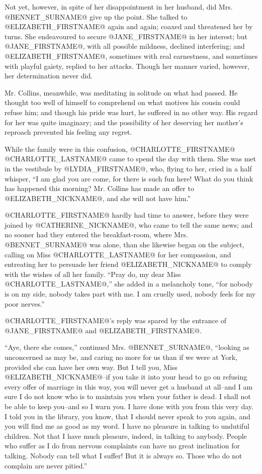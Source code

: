 Not yet, however, in spite of her disappointment in her husband, did
Mrs. @BENNET_SURNAME@ give up the point. She talked to @ELIZABETH_FIRSTNAME@ again and again;
coaxed and threatened her by turns. She endeavoured to secure @JANE_FIRSTNAME@
in her interest; but @JANE_FIRSTNAME@, with all possible mildness, declined
interfering; and @ELIZABETH_FIRSTNAME@, sometimes with real earnestness, and
sometimes with playful gaiety, replied to her attacks. Though her manner
varied, however, her determination never did.

Mr. Collins, meanwhile, was meditating in solitude on what had passed.
He thought too well of himself to comprehend on what motives his cousin
could refuse him; and though his pride was hurt, he suffered in no other
way. His regard for her was quite imaginary; and the possibility of her
deserving her mother's reproach prevented his feeling any regret.

While the family were in this confusion, @CHARLOTTE_FIRSTNAME@ @CHARLOTTE_LASTNAME@ came to spend
the day with them. She was met in the vestibule by @LYDIA_FIRSTNAME@, who, flying to
her, cried in a half whisper, ``I am glad you are come, for there is such
fun here! What do you think has happened this morning? Mr. Collins has
made an offer to @ELIZABETH_NICKNAME@, and she will not have him.''

@CHARLOTTE_FIRSTNAME@ hardly had time to answer, before they were joined by @CATHERINE_NICKNAME@,
who came to tell the same news; and no sooner had they entered the
breakfast-room, where Mrs. @BENNET_SURNAME@ was alone, than she likewise began on
the subject, calling on Miss @CHARLOTTE_LASTNAME@ for her compassion, and entreating
her to persuade her friend @ELIZABETH_NICKNAME@ to comply with the wishes of all her
family. ``Pray do, my dear Miss @CHARLOTTE_LASTNAME@,'' she added in a melancholy tone,
``for nobody is on my side, nobody takes part with me. I am cruelly used,
nobody feels for my poor nerves.''

@CHARLOTTE_FIRSTNAME@'s reply was spared by the entrance of @JANE_FIRSTNAME@ and @ELIZABETH_FIRSTNAME@.

``Aye, there she comes,'' continued Mrs. @BENNET_SURNAME@, ``looking as unconcerned
as may be, and caring no more for us than if we were at York, provided
she can have her own way. But I tell you, Miss @ELIZABETH_NICKNAME@--if you take it
into your head to go on refusing every offer of marriage in this way,
you will never get a husband at all--and I am sure I do not know who is
to maintain you when your father is dead. I shall not be able to keep
you--and so I warn you. I have done with you from this very day. I told
you in the library, you know, that I should never speak to you again,
and you will find me as good as my word. I have no pleasure in talking
to undutiful children. Not that I have much pleasure, indeed, in talking
to anybody. People who suffer as I do from nervous complaints can have
no great inclination for talking. Nobody can tell what I suffer! But it
is always so. Those who do not complain are never pitied.''

